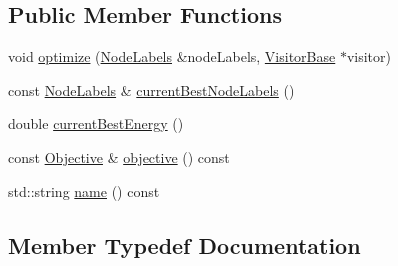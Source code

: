 \subsection*{Public Member Functions}
\begin{DoxyCompactItemize}
\item 
void \hyperlink{classnifty_1_1graph_1_1lifted__multicut_1_1PyLiftedMulticutBase_afb72076fb951b80781141b5c07961ad4}{optimize} (\hyperlink{classnifty_1_1graph_1_1lifted__multicut_1_1PyLiftedMulticutBase_ad79cf52f6bcbd7cfd9c8675d976b8a85}{Node\+Labels} \&node\+Labels, \hyperlink{classnifty_1_1graph_1_1lifted__multicut_1_1PyLiftedMulticutBase_a94d88bd4d7bf09e48fe8a89108f35070}{Visitor\+Base} $\ast$visitor)
\item 
const \hyperlink{classnifty_1_1graph_1_1lifted__multicut_1_1PyLiftedMulticutBase_ad79cf52f6bcbd7cfd9c8675d976b8a85}{Node\+Labels} \& \hyperlink{classnifty_1_1graph_1_1lifted__multicut_1_1PyLiftedMulticutBase_ab539048e8b335f2dcd6957bbcd107da2}{current\+Best\+Node\+Labels} ()
\item 
double \hyperlink{classnifty_1_1graph_1_1lifted__multicut_1_1PyLiftedMulticutBase_a6b5cd4033bb4044633c3cf41d1035c3c}{current\+Best\+Energy} ()
\item 
const \hyperlink{classnifty_1_1graph_1_1lifted__multicut_1_1PyLiftedMulticutBase_a1de54ff09e3f51a6c6bc92148e78ad44}{Objective} \& \hyperlink{classnifty_1_1graph_1_1lifted__multicut_1_1PyLiftedMulticutBase_a323e29f88e54144e57ab41a022e4632f}{objective} () const 
\item 
std\+::string \hyperlink{classnifty_1_1graph_1_1lifted__multicut_1_1PyLiftedMulticutBase_a705e42bcf26acd347bab7c718c967ce6}{name} () const 
\end{DoxyCompactItemize}


\subsection{Member Typedef Documentation}
\hypertarget{classnifty_1_1graph_1_1lifted__multicut_1_1PyLiftedMulticutBase_a315b2b14771d976533cedb73a8e8004a}{}

